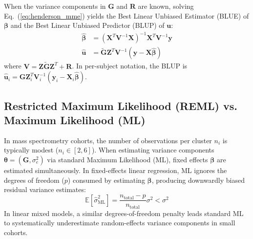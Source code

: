 \documentclass[11pt,twoside,openright]{book}
\begin{document}
When the variance components in $\mathbf{G}$ and $\mathbf{R}$ are known, solving Eq.~(\ref{eq:henderson_mme}) yields the Best Linear Unbiased Estimator (BLUE) of $\boldsymbol{\beta}$ and the Best Linear Unbiased Predictor (BLUP) of $\mathbf{u}$:
\begin{align}
\hat{\boldsymbol{\beta}} &= (\mathbf{X}^T \mathbf{V}^{-1} \mathbf{X})^{-1} \mathbf{X}^T \mathbf{V}^{-1} \mathbf{y} \label{eq:beta_gls} \\
\hat{\mathbf{u}} &= \widetilde{\mathbf{G}} \mathbf{Z}^T \mathbf{V}^{-1} (\mathbf{y} - \mathbf{X} \hat{\boldsymbol{\beta}}) \label{eq:u_blup}
\end{align}
where $\mathbf{V} = \mathbf{Z} \widetilde{\mathbf{G}} \mathbf{Z}^T + \mathbf{R}$. In per-subject notation, the BLUP is $\hat{\mathbf{u}}_i = \mathbf{G} \mathbf{Z}_i^T \mathbf{V}_i^{-1} (\mathbf{y}_i - \mathbf{X}_i \hat{\boldsymbol{\beta}})$.

\subsection{Restricted Maximum Likelihood (REML) vs. Maximum Likelihood (ML)}

In mass spectrometry cohorts, the number of observations per cluster $n_i$ is typically modest ($n_i \in [2, 6]$). When estimating variance components $\boldsymbol{\theta} = (\mathbf{G}, \sigma_e^2)$ via standard Maximum Likelihood (ML), fixed effects $\boldsymbol{\beta}$ are estimated simultaneously. In fixed-effects linear regression, ML ignores the degrees of freedom ($p$) consumed by estimating $\boldsymbol{\beta}$, producing downwardly biased residual variance estimates:
\begin{equation}
\label{eq:ml_bias}
\mathbb{E}[\hat{\sigma}^2_{\text{ML}}] = \frac{n_{\text{total}} - p}{n_{\text{total}}} \sigma^2 < \sigma^2
\end{equation}
In linear mixed models, a similar degrees-of-freedom penalty leads standard ML to systematically underestimate random-effects variance components in small cohorts.
\end{document}
